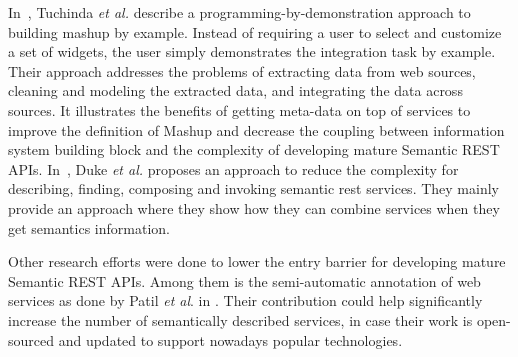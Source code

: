 In~\cite{Tuchinda:2011:BMD:1993053.1993058}, Tuchinda \textit{et al.} describe a programming-by-demonstration approach to building mashup by example. Instead of requiring a user to select and customize a set of widgets, the user simply demonstrates the integration task by example.  Their approach addresses the problems of extracting data from web sources, cleaning and modeling the extracted data, and integrating the data across sources. It illustrates the benefits of getting meta-data on top of services to improve the definition of Mashup and decrease the coupling between information system building block and the complexity of  developing mature Semantic REST APIs. In~\cite{10.1007/978-3-642-17694-4_11}, Duke  \textit{et al.} proposes an approach to reduce the complexity for describing, finding, composing and invoking semantic rest services. They mainly provide an approach where they show how they can combine services when they get semantics information. 

Other research efforts were done to lower the entry barrier for developing mature Semantic REST APIs.  Among them is the semi-automatic annotation of web services as done by Patil \textit{et al}. in \cite{patil2004meteor}. Their contribution could help significantly increase the number of semantically described services, in case their work is open-sourced and updated to support nowadays popular technologies.



